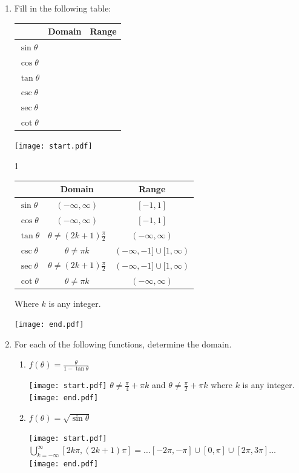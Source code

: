 \documentclass[12pt]{article}
\begin{document}
\begin{enumerate}
\newpage

\item Fill in the following table:
\begin{center}
\begin{tabular}{l|c|c}
& Domain & Range\\
\hline
$\sin{\theta}$ & &\\
\hline
$\cos{\theta}$ & &\\
\hline
$\tan{\theta}$ & &\\
\hline
$\csc{\theta}$ & &\\
\hline
$\sec{\theta}$ & &\\
\hline
$\cot{\theta}$ & &
\end{tabular}
\end{center}

\texttt{[image: start.pdf]}
{{1\linewidth}{
\begin{center}
\begin{tabular}{l|c|c}
& Domain & Range\\
\hline
$\sin{\theta}$ & $(-\infty,\infty)$ & $[-1,1]$\\
\hline
$\cos{\theta}$ & $(-\infty,\infty)$ & $[-1,1]$\\
\hline
$\tan{\theta}$ & $\theta\neq(2k+1)\tfrac{\pi}{2}$ & $(-\infty,\infty)$\\
\hline
$\csc{\theta}$ & $\theta\neq \pi k$ & $(-\infty,-1]\cup[1,\infty)$\\
\hline
$\sec{\theta}$ & $\theta\neq(2k+1)\tfrac{\pi}{2}$ & $(-\infty,-1]\cup[1,\infty)$\\
\hline
$\cot{\theta}$ & $\theta\neq \pi k$ & $(-\infty,\infty)$\\
\end{tabular}
\end{center}
Where $k$ is any integer.
}}
\texttt{[image: end.pdf]}


\item For each of the following functions, determine the domain.  

\begin{enumerate}

\item $f(\theta)=\frac{\theta}{1-\tan{\theta}}$

\texttt{[image: start.pdf]}
{$\theta\neq \frac{\pi}{4}+\pi k$ and $\theta \neq \frac{\pi}{2}+\pi k$ where $k$ is any integer.}
\texttt{[image: end.pdf]}


\item $f(\theta)=\sqrt{\sin{\theta}}$

\texttt{[image: start.pdf]}
{ $\bigcup\limits_{k=-\infty}^{\infty} \left[2k \pi, (2k+1)\pi\right]=\dots [-2\pi,-\pi]\cup[0,\pi]\cup[2\pi,3\pi]\dots$}
\texttt{[image: end.pdf]}


\end{enumerate}


\end{enumerate}
\end{document}
